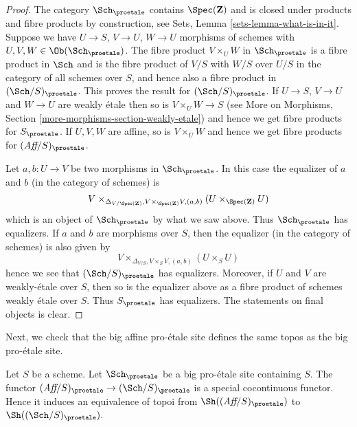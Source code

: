 \begin{proof}
The category $\Sch_\proetale$ contains $\Spec(\mathbf{Z})$ and
is closed under products and fibre products by construction, see
Sets, Lemma \ref{sets-lemma-what-is-in-it}.
Suppose we have $U \to S$, $V \to U$, $W \to U$ morphisms
of schemes with $U, V, W \in \Ob(\Sch_\proetale)$.
The fibre product $V \times_U W$ in $\Sch_\proetale$
is a fibre product in $\Sch$ and
is the fibre product of $V/S$ with $W/S$ over $U/S$ in
the category of all schemes over $S$, and hence also a
fibre product in $(\Sch/S)_\proetale$.
This proves the result for $(\Sch/S)_\proetale$.
If $U \to S$, $V \to U$ and $W \to U$ are weakly \'etale then so is
$V \times_U W \to S$ (see
More on Morphisms, Section \ref{more-morphisms-section-weakly-etale})
and hence we get fibre products for $S_\proetale$.
If $U, V, W$ are affine, so is $V \times_U W$ and hence we
get fibre products for $(\textit{Aff}/S)_\proetale$.

\medskip\noindent
Let $a, b : U \to V$ be two morphisms in $\Sch_\proetale$.
In this case the equalizer of $a$ and $b$ (in the category of schemes) is
$$
V
\times_{\Delta_{V/\Spec(\mathbf{Z})}, V \times_{\Spec(\mathbf{Z})} V, (a, b)}
(U \times_{\Spec(\mathbf{Z})} U)
$$
which is an object of $\Sch_\proetale$ by what we saw above.
Thus $\Sch_\proetale$ has equalizers. If $a$ and $b$ are morphisms over $S$,
then the equalizer (in the category of schemes) is also given by
$$
V \times_{\Delta_{V/S}, V \times_S V, (a, b)} (U \times_S U)
$$
hence we see that $(\Sch/S)_\proetale$ has equalizers. Moreover, if
$U$ and $V$ are weakly-\'etale over $S$, then so is the equalizer
above as a fibre product of schemes weakly \'etale over $S$.
Thus $S_\proetale$ has equalizers. The statements on final objects
is clear.
\end{proof}

\noindent
Next, we check that the big affine pro-\'etale site defines the same
topos as the big pro-\'etale site.

\begin{lemma}
\label{lemma-affine-big-site-proetale}
Let $S$ be a scheme. Let $\Sch_\proetale$ be a big pro-\'etale
site containing $S$.
The functor $(\textit{Aff}/S)_\proetale \to (\Sch/S)_\proetale$
is a special cocontinuous functor. Hence it induces an equivalence
of topoi from $\Sh((\textit{Aff}/S)_\proetale)$ to
$\Sh((\Sch/S)_\proetale)$.
\end{lemma}

